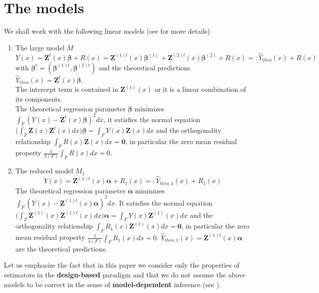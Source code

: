 \documentclass[a4paper,12pt,leqno, titlepage]{article}
\begin{document}
 \section{The models}
 We shall work with the following linear models (see \cite{mandallazreport2} for more details)
 \begin{enumerate}
 \item
 The large model $M$
 \begin{equation}\label{largemodel}
 Y(x)=\pmb{Z}^t(x)\pmb{\beta}+ R(x)=\pmb{Z}^{(1)t}(x)\pmb{\beta}^{(1)}
 +\pmb{Z}^{(2)t}(x)\pmb{\beta}^{(2)}+ R(x)=:\hat{Y}_{theo}(x)+R(x)
 \end{equation}
 \noindent with $\pmb{\beta}^t=({\pmb{\beta}^{(1)t}}, {\pmb{\beta}^{(2)t}})$ and the theoretical predictions
 $\hat{Y}_{theo}(x)=\pmb{Z}^t(x)\pmb{\beta}$.\\
 The intercept term is contained in $\pmb{Z}^{(1)}(x)$ or it is a linear combination of its components.\\
 The theoretical regression parameter $\pmb{\beta}$ minimizes
 $\int_F (Y(x)-\pmb{Z}^t(x)\pmb{\beta})^2dx$, it satisfies the normal equation
 $\big(\int_F\pmb{Z}(x)\pmb{Z}^t(x)dx\big)\pmb{\beta}=\int_F Y(x)\pmb{Z}(x)dx$ and the orthogonality relationship
 $\int_F R(x)\pmb{Z}(x)dx=\pmb{0}$, in particular the zero mean residual property
 $\frac{1}{\lambda(F)}\int_F R(x)dx=0$.
 \item
 The reduced model $M_1$
 \begin{equation}\label{reducedmodel}
 Y(x)=\pmb{Z}^{(1)t}(x)\pmb{\alpha} + R_1(x)=:\hat{Y}_{theo,1}(x)+ R_1(x)
 \end{equation}
 The theoretical regression parameter $\pmb{\alpha}$ minimizes
 $\int_F (Y(x)-\pmb{Z}^{(1)t}(x)\pmb{\alpha})^2dx$. It satisfies the normal equation
 $\big(\int_F \pmb{Z}^{(1)}(x)\pmb{Z}^{(1)t}(x)dx\big)\pmb{\alpha}=\int_FY(x)\pmb{Z}^{(1)}(x)dx$ and the orthogonality relationship
 $\int_F R_1(x)\pmb{Z}^{(1)}(x)dx=\pmb{0}$, in particular the zero mean residual property $ \frac{1}{\lambda(F)}\int_F R_1(x)dx=0$. $\hat{Y}_{theo,1}(x)=\pmb{Z}^{(1)t}(x)\pmb{\alpha}$ are the theoretical predictions.
\end{enumerate}
Let us emphasize the fact that in this paper we consider only the properties of estimators in the \textbf{design-based} paradigm and that we do not assume the above models to be correct in the sense of \textbf{model-dependent} inference
(see \cite{mandallaz3}).
\end{document}
